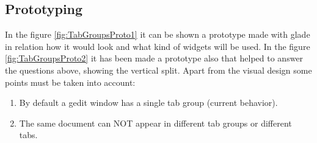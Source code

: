 \subsection{Prototyping}

In the figure \ref{fig:TabGroupsProto1} it can be shown a prototype made with glade in relation how it would look and what kind of widgets will be used. In the figure \ref{fig:TabGroupsProto2} it has been made a prototype also that helped to answer the questions above, showing the vertical split. Apart from the visual design some points must be taken into account:
\begin{enumerate}
  \item By default a gedit window has a single tab group (current behavior).
  \item The same document can NOT appear in different tab groups or different tabs.
\end{enumerate}

